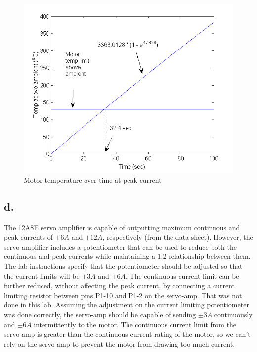 \documentclass{article}
\theoremstyle{plain}
\theoremstyle{definition}
\theoremstyle{remark}
\begin{document}
\begin{figure}[htb]
\begin{center}
\includegraphics[width = 12cm]{temperature.png}
\caption{Motor temperature over time at peak current}
\label{temperature}
\end{center}
\end{figure}

\subsection*{d.}
The 12A8E servo amplifier is capable of outputting maximum continuous and peak currents of $\pm 6A$ and $\pm 12A$, respectively (from the data sheet). However, the servo amplifier includes a potentiometer that can be used to reduce both the continuous and peak currents while maintaining a 1:2 relationship between them. The lab instructions specify that the potentiometer should be adjusted so that the current limits will be $\pm 3A$ and $\pm 6A$.  The continuous current limit can be further reduced, without affecting the peak current, by connecting a current limiting resistor between pins P1-10 and P1-2 on the servo-amp. That was not done in this lab. Assuming the adjustment on the current limiting potentiometer was done correctly, the servo-amp should be capable of sending $\pm 3A$ continuously and $\pm6A$ intermittently to the motor. The continuous current limit from the servo-amp is greater than the continuous current rating of the motor, so we can't rely on the servo-amp to prevent the motor from drawing too much current.\\
\end{document}
